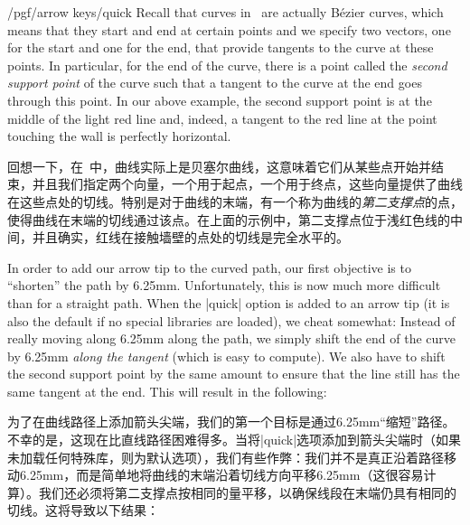 \begin{key}{/pgf/arrow keys/quick}
    Recall that curves in \tikzname\ are actually Bézier curves, which means
    that they start and end at certain points and we specify two vectors, one
    for the start and one for the end, that provide tangents to the curve at
    these points. In particular, for the end of the curve, there is a point
    called the \emph{second support point} of the curve such that a tangent to
    the curve at the end goes through this point. In our above example, the
    second support point is at the middle of the light red line and, indeed, a
    tangent to the red line at the point touching the wall is perfectly
    horizontal.

    回想一下，在\tikzname\ 中，曲线实际上是贝塞尔曲线，这意味着它们从某些点开始并结束，并且我们指定两个向量，一个用于起点，一个用于终点，这些向量提供了曲线在这些点处的切线。特别是对于曲线的末端，有一个称为曲线的\emph{第二支撑点}的点，使得曲线在末端的切线通过该点。在上面的示例中，第二支撑点位于浅红色线的中间，并且确实，红线在接触墙壁的点处的切线是完全水平的。

    In order to add our arrow tip to the curved path, our first objective is to
    ``shorten'' the path by 6.25mm. Unfortunately, this is now much more
    difficult than for a straight path. When the |quick| option is added to an
    arrow tip (it is also the default if no special libraries are loaded), we
    cheat somewhat: Instead of really moving along 6.25mm along the path, we
    simply shift the end of the curve by 6.25mm \emph{along the tangent} (which
    is easy to compute). We also have to shift the second support point by the
    same amount to ensure that the line still has the same tangent at the end.
    This will result in the following:
    
    为了在曲线路径上添加箭头尖端，我们的第一个目标是通过6.25mm“缩短”路径。不幸的是，这现在比直线路径困难得多。当将|quick|选项添加到箭头尖端时（如果未加载任何特殊库，则为默认选项），我们有些作弊：我们并不是真正沿着路径移动6.25mm，而是简单地将曲线的末端沿着切线方向平移6.25mm（这很容易计算）。我们还必须将第二支撑点按相同的量平移，以确保线段在末端仍具有相同的切线。这将导致以下结果：
%
\begin{codeexample}[preamble={\usetikzlibrary{arrows.meta}}]
\end{codeexample}


\end{key}
